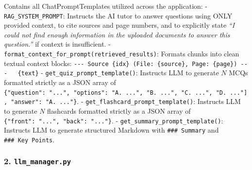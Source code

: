 \documentclass[
]{article}
\begin{document}
Contains all ChatPromptTemplates utilized across the application: -
\texttt{RAG\_\allowbreak SYSTEM\_\allowbreak PROMPT}: Instructs the AI tutor to answer questions
using ONLY provided context, to cite sources and page numbers, and to
explicitly state \emph{``I could not find enough information in the
uploaded documents to answer this question.''} if context is
insufficient. -
\texttt{format\_\allowbreak context\_\allowbreak for\_\allowbreak prompt(\allowbreak retrieved\_\allowbreak results)\allowbreak }: Formats
chunks into clean textual context blocks:
\texttt{-\/\allowbreak -\/\allowbreak -\ \allowbreak Source\ \allowbreak \{idx\}\ \allowbreak (\allowbreak File:\ \allowbreak \{source\},\allowbreak \ \allowbreak Page:\ \allowbreak \{page\})\allowbreak \ \allowbreak -\/\allowbreak -\/\allowbreak -\ \allowbreak \ \allowbreak \ \allowbreak \{text\}}
- \texttt{get\_\allowbreak quiz\_\allowbreak prompt\_\allowbreak template(\allowbreak )\allowbreak }: Instructs LLM to generate
\(N\) MCQs formatted strictly as a JSON array of
\texttt{\{"question":\ \allowbreak ".\allowbreak .\allowbreak .",\allowbreak \ \allowbreak "options":\ \allowbreak {[}"A.\ \allowbreak .\allowbreak .\allowbreak .",\allowbreak \ \allowbreak "B.\ \allowbreak .\allowbreak .\allowbreak .",\allowbreak \ \allowbreak "C.\ \allowbreak .\allowbreak .\allowbreak .",\allowbreak \ \allowbreak "D.\ \allowbreak .\allowbreak .\allowbreak ."{]},\allowbreak \ \allowbreak "answer":\ \allowbreak "A.\ \allowbreak .\allowbreak .\allowbreak ."\}}.
- \texttt{get\_\allowbreak flashcard\_\allowbreak prompt\_\allowbreak template(\allowbreak )\allowbreak }: Instructs LLM to generate
\(N\) flashcards formatted strictly as a JSON array of
\texttt{\{"front":\ \allowbreak ".\allowbreak .\allowbreak .",\allowbreak \ \allowbreak "back":\ \allowbreak ".\allowbreak .\allowbreak ."\}}. -
\texttt{get\_\allowbreak summary\_\allowbreak prompt\_\allowbreak template(\allowbreak )\allowbreak }: Instructs LLM to generate
structured Markdown with \texttt{\#\#\#\ \allowbreak Summary} and
\texttt{\#\#\#\ \allowbreak Key\ \allowbreak Points}.

\subsubsection{\texorpdfstring{2.
\texttt{llm\_\allowbreak manager.\allowbreak py}}{2. llm\_manager.py}}\label{llm_manager.py}
\end{document}

